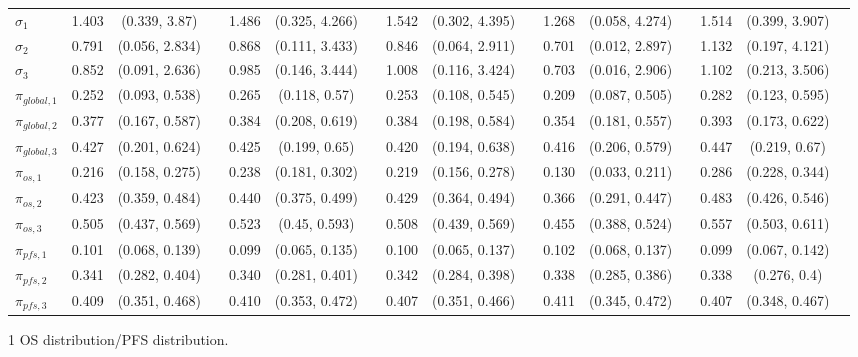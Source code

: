 \documentclass[AMA,STIX1COL]{WileyNJD-v2}
\begin{document}
\begin{landscape}
\begin{center}
\begin{table}[t]
\begin{tabular}{l c c c c c c c c c c c c c c c}
$\sigma_1$ & 1.403 & (0.339, 3.87) &  & 1.486 & (0.325, 4.266) &  & 1.542 & (0.302, 4.395) &  & 1.268 & (0.058, 4.274) &  & 1.514 & (0.399, 3.907) & \\
$\sigma_2$ & 0.791 & (0.056, 2.834) &  & 0.868 & (0.111, 3.433) &  & 0.846 & (0.064, 2.911) &  & 0.701 & (0.012, 2.897) &  & 1.132 & (0.197, 4.121) & \\
$\sigma_3$ & 0.852 & (0.091, 2.636) &  & 0.985 & (0.146, 3.444) &  & 1.008 & (0.116, 3.424) &  & 0.703 & (0.016, 2.906) &  & 1.102 & (0.213, 3.506) & \\
$\pi_{global, 1}$ & 0.252 & (0.093, 0.538) &  & 0.265 & (0.118, 0.57) &  & 0.253 & (0.108, 0.545) &  & 0.209 & (0.087, 0.505) &  & 0.282 & (0.123, 0.595) & \\
$\pi_{global, 2}$ & 0.377 & (0.167, 0.587) &  & 0.384 & (0.208, 0.619) &  & 0.384 & (0.198, 0.584) &  & 0.354 & (0.181, 0.557) &  & 0.393 & (0.173, 0.622) & \\
$\pi_{global, 3}$ & 0.427 & (0.201, 0.624) &  & 0.425 & (0.199, 0.65) &  & 0.420 & (0.194, 0.638) &  & 0.416 & (0.206, 0.579) &  & 0.447 & (0.219, 0.67) & \\
$\pi_{os, 1}$ & 0.216 & (0.158, 0.275) &  & 0.238 & (0.181, 0.302) &  & 0.219 & (0.156, 0.278) &  & 0.130 & (0.033, 0.211) &  & 0.286 & (0.228, 0.344) & \\
$\pi_{os, 2}$ & 0.423 & (0.359, 0.484) &  & 0.440 & (0.375, 0.499) &  & 0.429 & (0.364, 0.494) &  & 0.366 & (0.291, 0.447) &  & 0.483 & (0.426, 0.546) & \\
$\pi_{os, 3}$ & 0.505 & (0.437, 0.569) &  & 0.523 & (0.45, 0.593) &  & 0.508 & (0.439, 0.569) &  & 0.455 & (0.388, 0.524) &  & 0.557 & (0.503, 0.611) & \\
$\pi_{pfs, 1}$ & 0.101 & (0.068, 0.139) &  & 0.099 & (0.065, 0.135) &  & 0.100 & (0.065, 0.137) &  & 0.102 & (0.068, 0.137) &  & 0.099 & (0.067, 0.142) & \\
$\pi_{pfs, 2}$ & 0.341 & (0.282, 0.404) &  & 0.340 & (0.281, 0.401) &  & 0.342 & (0.284, 0.398) &  & 0.338 & (0.285, 0.386) &  & 0.338 & (0.276, 0.4) & \\
$\pi_{pfs, 3}$ & 0.409 & (0.351, 0.468) &  & 0.410 & (0.353, 0.472) &  & 0.407 & (0.351, 0.466) &  & 0.411 & (0.345, 0.472) &  & 0.407 & (0.348, 0.467) & \\
\bottomrule
\end{tabular}
\begin{tablenotes}%
\item[1] OS distribution/PFS distribution.
\end{tablenotes}
\end{table}
\end{center}
\end{landscape}
\end{document}
